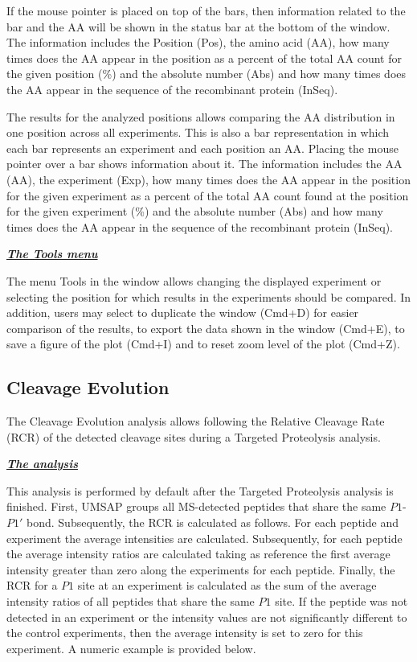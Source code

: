 If the mouse pointer is placed on top of the bars, then information related to the
bar and the AA will be shown in the status bar at the bottom of the window. The
information includes the Position (Pos), the amino acid (AA), how many times does
the AA appear in the position as a percent of the total AA count for the given position
(\%) and the absolute number (Abs) and how many times does the AA appear in the sequence
of the recombinant protein (InSeq).

The results for the analyzed positions allows comparing the AA distribution in one
position across all experiments. This is also a bar representation in which each
bar represents an experiment and each position an AA. Placing the mouse pointer
over a bar shows information about it. The information includes the AA (AA), the
experiment (Exp), how many times does the AA appear in the position for the given
experiment as a percent of the total AA count found at the position for the given
experiment (\%) and the absolute number (Abs) and how many times does the AA appear
in the sequence of the recombinant protein (InSeq).

\textit{\textbf{\underline{The Tools menu}}}

The menu Tools in the window allows changing the displayed experiment or selecting
the position for which results in the experiments should be compared. In addition,
users may select to duplicate the window (Cmd+D) for easier comparison of the results,
to export the data shown in the window (Cmd+E), to save a figure of the plot (Cmd+I)
and to reset zoom level of the plot (Cmd+Z).

\subsection{Cleavage Evolution}
\label{subsec:tarprotCutEvol}

The Cleavage Evolution analysis allows following the Relative Cleavage Rate (RCR)
of the detected cleavage sites during a Targeted Proteolysis analysis.

\textit{\textbf{\underline{The analysis}}}

This analysis is performed by default after the Targeted Proteolysis analysis is
finished. First, UMSAP groups all MS-detected peptides that share the same \(P1\)-\(P1'\)
bond. Subsequently, the RCR is calculated as follows. For each
peptide and experiment the average intensities are calculated. Subsequently, for
each peptide the average intensity ratios are calculated taking as reference the
first average intensity greater than zero along the experiments for each peptide.
Finally, the RCR for a \(P1\) site at an experiment is calculated
as the sum of the average intensity ratios of all peptides that share the same \(P1\)
site. If the peptide was not detected in an experiment or the intensity values are
not significantly different to the control experiments, then the average intensity
is set to zero for this experiment. A numeric example is provided below.

